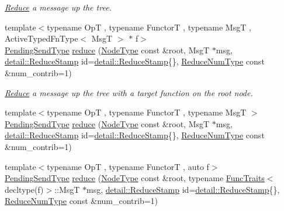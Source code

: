 \begin{DoxyCompactItemize}
\begin{DoxyCompactList}\small\item\em \hyperlink{structvt_1_1collective_1_1reduce_1_1_reduce}{Reduce} a message up the tree. \end{DoxyCompactList}\item 
{\footnotesize template$<$typename OpT , typename FunctorT , typename MsgT , Active\+Typed\+Fn\+Type$<$ Msg\+T $>$ $\ast$ f$>$ }\\\hyperlink{structvt_1_1collective_1_1reduce_1_1_reduce_a0474b491f3c93014d9a0ce0356c6bfd5}{Pending\+Send\+Type} \hyperlink{structvt_1_1collective_1_1reduce_1_1_reduce_a1b5753c2a9b1ce49415d313752f720aa}{reduce} (\hyperlink{namespacevt_a866da9d0efc19c0a1ce79e9e492f47e2}{Node\+Type} const \&root, MsgT $\ast$msg, \hyperlink{namespacevt_1_1collective_1_1reduce_1_1detail_aacc1fcd729d934ba143fee3a943bf9e7}{detail\+::\+Reduce\+Stamp} id=\hyperlink{namespacevt_1_1collective_1_1reduce_1_1detail_aacc1fcd729d934ba143fee3a943bf9e7}{detail\+::\+Reduce\+Stamp}\{\}, \hyperlink{structvt_1_1collective_1_1reduce_1_1_reduce_a6c3e63aca10c31d2823b0b18cf9762a4}{Reduce\+Num\+Type} const \&num\+\_\+contrib=1)
\begin{DoxyCompactList}\small\item\em \hyperlink{structvt_1_1collective_1_1reduce_1_1_reduce}{Reduce} a message up the tree with a target function on the root node. \end{DoxyCompactList}\item 
{\footnotesize template$<$typename OpT , typename FunctorT , typename MsgT $>$ }\\\hyperlink{structvt_1_1collective_1_1reduce_1_1_reduce_a0474b491f3c93014d9a0ce0356c6bfd5}{Pending\+Send\+Type} \hyperlink{structvt_1_1collective_1_1reduce_1_1_reduce_abac393d6b92dc86e4b1ecdef07cec2c0}{reduce} (\hyperlink{namespacevt_a866da9d0efc19c0a1ce79e9e492f47e2}{Node\+Type} const \&root, MsgT $\ast$msg, \hyperlink{namespacevt_1_1collective_1_1reduce_1_1detail_aacc1fcd729d934ba143fee3a943bf9e7}{detail\+::\+Reduce\+Stamp} id=\hyperlink{namespacevt_1_1collective_1_1reduce_1_1detail_aacc1fcd729d934ba143fee3a943bf9e7}{detail\+::\+Reduce\+Stamp}\{\}, \hyperlink{structvt_1_1collective_1_1reduce_1_1_reduce_a6c3e63aca10c31d2823b0b18cf9762a4}{Reduce\+Num\+Type} const \&num\+\_\+contrib=1)
\item 
{\footnotesize template$<$typename OpT , typename FunctorT , auto f$>$ }\\\hyperlink{structvt_1_1collective_1_1reduce_1_1_reduce_a0474b491f3c93014d9a0ce0356c6bfd5}{Pending\+Send\+Type} \hyperlink{structvt_1_1collective_1_1reduce_1_1_reduce_a7389031519cb9fd1b8dde2c3b19db7e0}{reduce} (\hyperlink{namespacevt_a866da9d0efc19c0a1ce79e9e492f47e2}{Node\+Type} const \&root, typename \hyperlink{structvt_1_1_func_traits}{Func\+Traits}$<$ decltype(f)$>$\+::MsgT $\ast$msg, \hyperlink{namespacevt_1_1collective_1_1reduce_1_1detail_aacc1fcd729d934ba143fee3a943bf9e7}{detail\+::\+Reduce\+Stamp} id=\hyperlink{namespacevt_1_1collective_1_1reduce_1_1detail_aacc1fcd729d934ba143fee3a943bf9e7}{detail\+::\+Reduce\+Stamp}\{\}, \hyperlink{structvt_1_1collective_1_1reduce_1_1_reduce_a6c3e63aca10c31d2823b0b18cf9762a4}{Reduce\+Num\+Type} const \&num\+\_\+contrib=1)

\end{DoxyCompactItemize}
